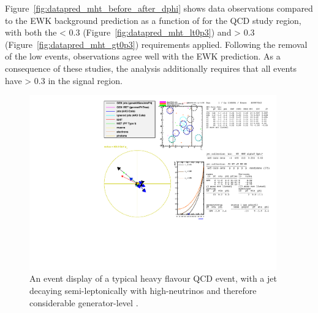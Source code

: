 Figure~\ref{fig:datapred_mht_before_after_dphi} shows data observations
compared to the EWK background prediction as a
function of \mht for the QCD study region, with both the
\mindphistar < 0.3 (Figure~\ref{fig:datapred_mht_lt0p3}) and
\mindphistar > 0.3 (Figure~\ref{fig:datapred_mht_gt0p3}) requirements applied.
Following the removal of the low \mindphistar events, observations agree well
with the EWK prediction. As a consequence of these studies, the analysis
additionally requires that all events have \mindphistar > 0.3 in the signal
region.


\clearpage
\begin{figure}
    \centering
    \includegraphics[width=0.95\textwidth]
    {Figs/eventDisplays/Had_QCD_MG_MC_HT375_skim_displays_singleEvent_2_noPF.pdf}
    \caption{An event display of a typical heavy flavour QCD event, with a jet
    decaying semi-leptonically with high-\Pt neutrinos and therefore
    considerable generator-level \met.}
    \label{fig:event_display_QCD}
\end{figure}





